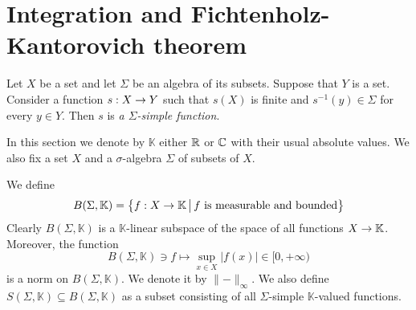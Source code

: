 \section{Integration and Fichtenholz-Kantorovich theorem}

\begin{definition}
    Let $X$ be a set and let $\Sigma$ be an algebra of its subsets. Suppose that $Y$ is a set. Consider a function $s:X\rightarrow Y$ such that $s(X)$ is finite and $s^{-1}(y) \in \Sigma$ for every $y \in Y$. Then $s$ is \textit{a $\Sigma$-simple function}.
\end{definition}
\noindent
In this section we denote by $\mathbb{K}$ either ${\mathbb R}$ or ${\mathbb C}$ with their usual absolute values. We also fix a set $X$ and a $\sigma$-algebra $\Sigma$ of subsets of $X$.

We define
$$B(\Sigma,\mathbb{K}) = \big\{f:X\rightarrow \mathbb{K}\,\big|\,f\mbox{ is measurable and bounded}\big\}$$
Clearly $B(\Sigma, \mathbb{K})$ is a $\mathbb{K}$-linear subspace of the space of all functions $X\rightarrow \mathbb{K}$. Moreover, the function
$$B(\Sigma,\mathbb{K}) \ni f \mapsto \sup_{x\in X}|f(x)|\in [0,+\infty)$$
is a norm on $B(\Sigma, \mathbb{K})$. We denote it by $\lVert-\rVert_{\infty}$. We also define $S(\Sigma,\mathbb{K})\subseteq B(\Sigma,\mathbb{K})$ as a subset consisting of all $\Sigma$-simple $\mathbb{K}$-valued functions.

